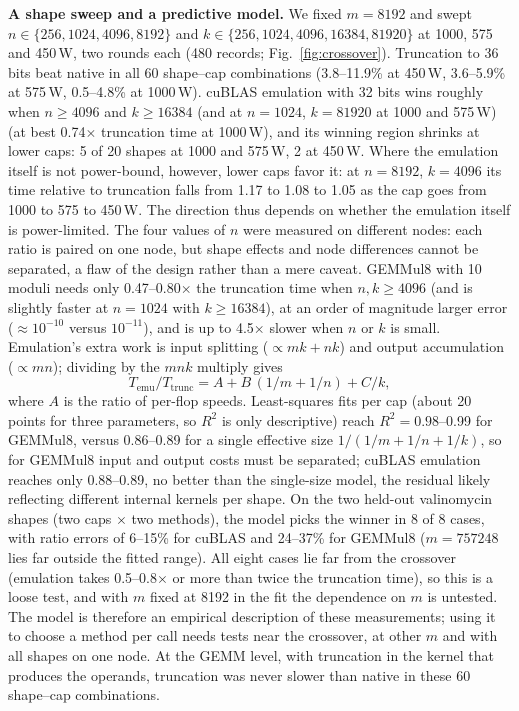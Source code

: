 \documentclass[conference]{IEEEtran}
\newcommand{\W}{\,W}
\newcommand{\pct}{\%}
\begin{document}
\textbf{A shape sweep and a predictive model.} We fixed $m=8192$ and swept $n\in\{256,1024,4096,8192\}$ and
$k\in\{256,1024,4096,16384,81920\}$ at 1000, 575 and 450\W, two rounds each (480 records; Fig.~\ref{fig:crossover}).
Truncation to 36 bits beat native in all 60 shape--cap combinations (3.8--11.9\pct{} at 450\W, 3.6--5.9\pct{} at
575\W, 0.5--4.8\pct{} at 1000\W). cuBLAS emulation with 32 bits wins roughly when $n\ge4096$ and $k\ge16384$ (and at $n=1024$, $k=81920$ at 1000 and 575\W) (at
best 0.74$\times$ truncation time at 1000\W), and its winning region shrinks at lower caps: 5 of 20 shapes at 1000
and 575\W, 2 at 450\W. Where the emulation itself is not power-bound, however, lower caps favor it: at $n=8192$,
$k=4096$ its time relative to truncation falls from 1.17 to 1.08 to 1.05 as the cap goes from 1000 to 575 to
450\W. The direction thus depends on whether the emulation itself is power-limited. The four values of $n$ were
measured on different nodes: each ratio is paired on one node, but shape effects and node differences cannot be
separated, a flaw of the design rather than a mere caveat. GEMMul8 with 10 moduli needs only 0.47--0.80$\times$ the truncation time when $n,k\ge4096$ (and is slightly faster at $n=1024$ with $k\ge16384$),
at an order of magnitude larger error ($\approx10^{-10}$ versus $10^{-11}$), and is up to 4.5$\times$ slower when $n$ or
$k$ is small. Emulation's extra work is input splitting ($\propto mk+nk$) and output accumulation ($\propto mn$);
dividing by the $mnk$ multiply gives
\begin{equation}
T_\mathrm{emu}/T_\mathrm{trunc} = A + B\,(1/m + 1/n) + C/k,
\end{equation}
where $A$ is the ratio of per-flop speeds. Least-squares fits per cap (about 20 points for three parameters, so $R^2$ is only descriptive) reach $R^2=0.98$--0.99 for GEMMul8, versus
0.86--0.89 for a single effective size $1/(1/m+1/n+1/k)$, so for GEMMul8 input and output costs must be separated;
cuBLAS emulation reaches only 0.88--0.89, no better than the single-size model, the residual likely reflecting
different internal kernels per shape. On the two held-out valinomycin shapes (two caps $\times$ two methods), the
model picks the winner in 8 of 8 cases, with ratio errors of 6--15\pct{} for cuBLAS and 24--37\pct{} for GEMMul8
($m=757248$ lies far outside the fitted range). All eight cases lie far from the crossover (emulation takes
0.5--0.8$\times$ or more than twice the truncation time), so this is a loose test, and with $m$ fixed at 8192 in the
fit the dependence on $m$ is untested. The model is therefore an empirical description of these measurements; using it
to choose a method per call needs tests near the crossover, at other $m$ and with all shapes on one node. At the GEMM level, with truncation in the kernel that produces the operands, truncation
was never slower than native in these 60 shape--cap combinations.
\end{document}

